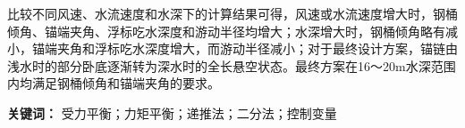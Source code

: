比较不同风速、水流速度和水深下的计算结果可得，风速或水流速度增大时，钢桶倾角、锚端夹角、浮标吃水深度和游动半径均增大；水深增大时，钢桶倾角略有减小，锚端夹角和浮标吃水深度增大，而游动半径减小；对于最终设计方案，锚链由浅水时的部分卧底逐渐转为深水时的全长悬空状态。最终方案在16～20m水深范围内均满足钢桶倾角和锚端夹角的要求。

\noindent\textbf{关键词：} 受力平衡；力矩平衡；递推法；二分法；控制变量
